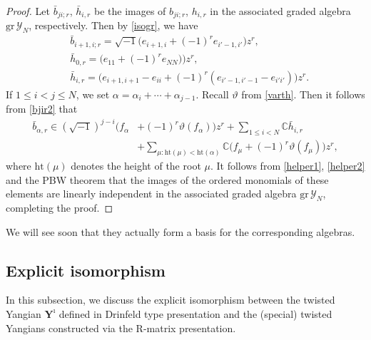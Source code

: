 \documentclass[11pt,reqno]{amsart}
\numberwithin{equation}{section}
\theoremstyle{definition}
\theoremstyle{remark}
\newcommand{\beq}{\begin{equation}}
\newcommand{\eeq}{\end{equation}}
\newcommand{\bC}{\mathbb{C}}
\newcommand{\gr}{{\mathrm{gr}}}
\newcommand{\lle}{\leqslant}
\newcommand{\Y}{{\mathscr{Y}}}
\newcommand{\Yi}{{\mathbf{Y}^\imath}}
\def \C{\mathbb{C}}
\begin{document}
\begin{proof}
Let $\bar b_{ji;r}$, $\bar h_{i,r}$ be the images of $b_{ji;r}$, $h_{i,r}$ in the associated graded algebra $\gr\,\Y_N$, respectively. Then by \eqref{isogr}, we have %
\beq\label{helper1}
\begin{split}
&\bar b_{i+1,i;r}=\sqrt{-1}\big(e_{i+1,i}+(-1)^re_{i'-1,i'}\big)z^r,\\
&\bar h_{0,r}=\big(e_{11}+(-1)^re_{NN})\big)z^r,\\
&\bar h_{i,r}=\big(e_{i+1,i+1}-e_{ii}+(-1)^r(e_{i'-1,i'-1}-e_{i'i'})\big)z^r.    
\end{split}
\eeq
If $1\lle i<j\lle N$, we set $\alpha=\alpha_i+\cdots+\alpha_{j-1}$. Recall $\vartheta$ from \eqref{varth}. Then it follows from \eqref{bjir2} that
\beq\label{helper2}
\begin{split}
\bar b_{\alpha,r}\in (\sqrt{-1})^{j-i}\big(f_{\alpha}&+(-1)^r\vartheta(f_{\alpha})\big)z^r+\sum_{1\lle i< N} \bC\bar h_{i,r}\\
&+\sum_{\mu:\mathrm{ht}(\mu) <\mathrm{ht}(\alpha)}\C\big(f_{\mu}+(-1)^r\vartheta(f_{\mu})\big)z^r,
\end{split}
\eeq
where $\mathrm{ht}(\mu)$ denotes the height of the root $\mu$. It follows from \eqref{helper1}, \eqref{helper2} and the PBW theorem that the images of the ordered monomials of these elements  are linearly independent in the associated graded algebra $\gr\,\Y_N$, completing the proof.
\end{proof}

We will see soon that they actually form a basis for the corresponding algebras. 

\subsection{Explicit isomorphism}\label{sec:iso-GD}
In this subsection, we discuss the explicit isomorphism between the twisted Yangian $\Yi$ defined in Drinfeld type presentation and the (special) twisted Yangians constructed via the R-matrix presentation.
\end{document}

